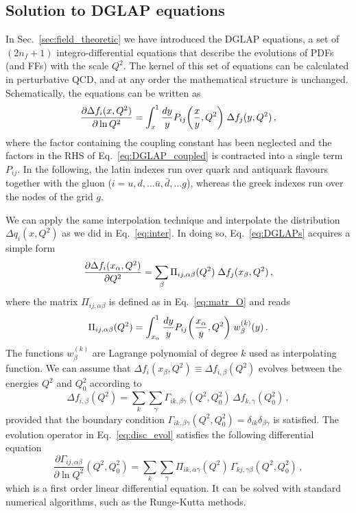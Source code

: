 \subsection*{Solution to DGLAP equations}
In Sec.~\ref{sec:field_theoretic} we have introduced the DGLAP equations, a set of $(2 n_f + 1)$ integro-differential equations that describe the evolutions of PDFs (and FFs) with the scale $Q^2$. The kernel of this set of equations can be calculated in perturbative QCD, and at any order the mathematical structure is unchanged. Schematically, the equations can be written as 
\begin{equation}
  \pdv{\Delta f_i(x, Q^2)}{\ln Q^2} = \int_x^1 \frac{dy}{y} P_{ij} \qty(\frac{x}{y}, Q^2) \; \Delta f_j(y,Q^2) \, ,
  \label{eq:DGLAPs}
\end{equation} 
where the factor containing the coupling constant has been neglected and the factors in the RHS of Eq.~\eqref{eq:DGLAP_coupled} is contracted into a single term $P_{ij}$. In the following, the latin indexes run over quark and antiquark flavours together with the gluon ($i=u,d,\dots \bar{u},\bar{d}, \dots g$), whereas the greek indexes run over the nodes of the grid $g$.\par
We can apply the same interpolation technique and interpolate the distribution $\Delta q_{i}(x,Q^2)$ as we did in Eq.~\eqref{eq:inter}. In doing so, Eq.~\eqref{eq:DGLAPs} acquires a simple form
\begin{equation}
  \pdv{\Delta f_i(x_{\alpha},Q^2)}{Q^2} = \sum_{\beta} \Pi_{ij,\alpha \beta} (Q^2) \; \Delta f_j(x_{\beta}, Q^2) \,,
  \label{eq:DGLAP_recast}
\end{equation}
where the matrix $\Pi_{ij,\alpha \beta}$ is defined as in Eq.~\eqref{eq:matr_O} and reads
\begin{equation}
  \Pi_{ij,\alpha \beta} (Q^2) = \int_{x_{\alpha}}^1 \frac{dy}{y} P_{ij} \qty(\frac{x_{\alpha}}{y}, Q^2) \; w_{\beta}^{(k)} (y)\,.
\end{equation}
The functions $w_{\beta}^{(k)}$ are Lagrange polynomial of degree $k$ used as interpolating function. We can assume that $\Delta f_i(x_{\beta},Q^2) \equiv \Delta f_{i,\beta}(Q^2)$ evolves between the energies $Q^2$ and $Q^2_0$ according to
\begin{equation}
  \Delta f_{i,\beta} (Q^2) = \sum_{k} \sum_{\gamma} \Gamma_{ik,\beta \gamma} (Q^2,Q^2_0) \, \Delta f_{k,\gamma} (Q^2_0) \,,
  \label{eq:disc_evol}
\end{equation}
provided that the boundary condition $\Gamma_{ik,\beta \gamma} (Q^2,Q^2_0) = \delta_{ik} \delta_{\beta \gamma}$ is satisfied. The evolution operator in Eq.~\eqref{eq:disc_evol} satisfies the following differential equation
\begin{equation}
  \frac{\partial \Gamma_{ij,\alpha \beta} }{\partial \ln Q^2} (Q^2,Q^2_0) = \sum_{k} \sum_{\gamma} \Pi_{ik,\alpha \gamma}(Q^2) \, \Gamma_{kj,\gamma \beta}(Q^2,Q^2_0)  \,,
  \label{eq:sys_DGLAP_kernel}
\end{equation}
which is a first order linear differential equation. It can be solved with standard numerical algorithms, such as the Runge-Kutta methods.\par

